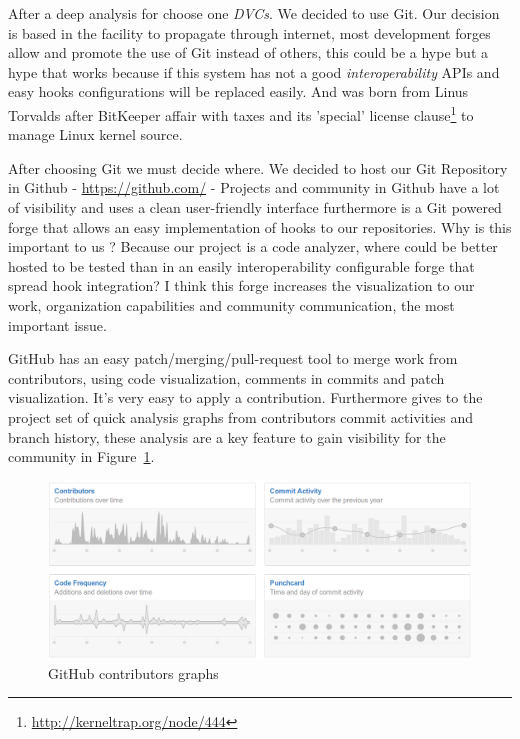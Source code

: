 \documentclass[11pt]{scrartcl}
\begin{document}
\par After a deep analysis for choose one \emph{DVCs}. We decided to use Git. Our decision is based in the facility to propagate through internet, most development forges allow and promote the use of Git instead of others, this could be a hype but a hype that works because if this system has not a good \emph{interoperability} APIs and easy hooks configurations will be replaced easily. And was born from Linus Torvalds after BitKeeper affair with taxes and its 'special' license clause\footnote{\url{http://kerneltrap.org/node/444}} to manage Linux kernel source.

\par After choosing Git we must decide where. We decided to host our Git Repository in Github - \url{https://github.com/} - Projects and community in Github have a lot of visibility and uses a clean user-friendly interface furthermore is a Git powered forge that allows an easy implementation of hooks to our repositories. Why is this important to us ? Because our project is a code analyzer, where could be better hosted to be tested than in an easily interoperability configurable forge that spread hook integration? I think this forge increases the visualization to our work, organization capabilities and community communication, the most important issue. 

\par GitHub has an easy patch/merging/pull-request tool to merge work from contributors, using code visualization, comments in commits and patch visualization. It's very easy to apply a contribution. Furthermore gives to the project set of quick analysis graphs from contributors commit activities and branch history, these analysis are a key feature to gain visibility for the community in Figure~\ref{github-graphs}.

\begin{figure}[H]
\centering
\includegraphics[width=1\textwidth]{github-graphs.png}
\caption{GitHub contributors graphs}
\label{github-graphs}
\end{figure}
\end{document}
